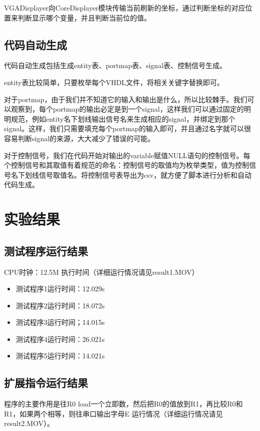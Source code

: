 \documentclass{article}
\begin{document}
VGADisplayer向CoreDisplayer模块传输当前刷新的坐标，通过判断坐标的对应位置来判断显示哪个变量，并且判断当前位的值。

\subsection{代码自动生成}
代码自动生成包括生成entity表、portmap表、signal表、控制信号生成。

entity表比较简单，只要枚举每个VHDL文件，将相关关键字替换即可。

对于portmap，由于我们并不知道它的输入和输出是什么，所以比较棘手。我们可以观察到，每个portmap的输出必定是到一个signal，这样我们可以通过固定的明明规范，例如entity名下划线输出信号名来生成相应的signal，并绑定到那个signal。这样，我们只需要填充每个portmap的输入即可，并且通过名字就可以很容易判断signal的来源，大大减少了错误的可能。

对于控制信号，我们在代码开始对输出的variable赋值NULL语句的控制信号。每个控制信号和其取值有着规范的命名：控制信号的取值均为枚举类型，值为控制信号名下划线信号取值名。将控制信号表导出为csv，就方便了脚本进行分析和自动代码生成。

\section{实验结果}
\subsection{测试程序运行结果} 
CPU时钟：12.5M
执行时间（详细运行情况请见result1.MOV）
\begin{itemize}
    \item 测试程序1运行时间：12.029s
    \item 测试程序2运行时间：18.072s
    \item 测试程序3运行时间；14.015s
    \item 测试程序4运行时间：26.021s
    \item 测试程序5运行时间：14.021s
\end{itemize} 
\subsection{扩展指令运行结果}
程序的主要作用是往R0 load一个立即数，然后把R0的值放到R1，再比较R0和R1，如果两个相等，则往串口输出字母E
运行情况（详细运行情况请见result2.MOV）。
\end{document}
